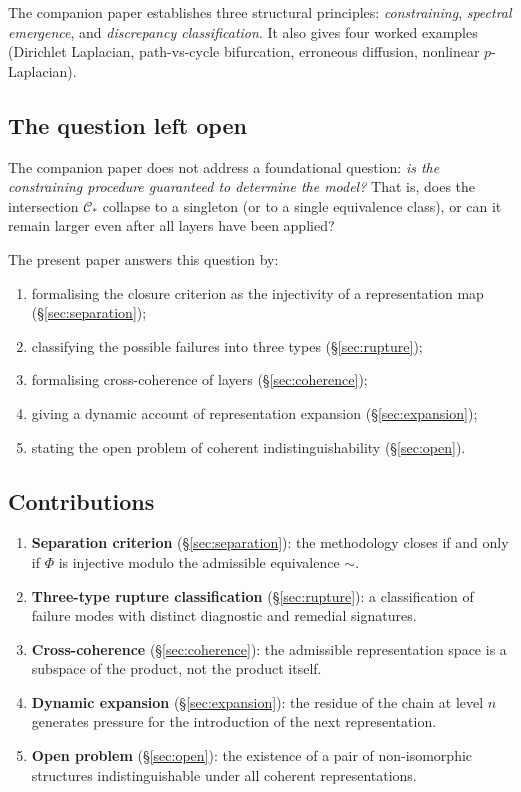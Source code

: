 \documentclass[11pt,a4paper]{article}
\theoremstyle{definition}
\theoremstyle{plain}
\newcommand{\Ccal}{\mathcal{C}}
\newcommand{\Phimap}{\Phi}
\newcommand{\simadm}{\sim}
\begin{document}
The companion paper establishes three structural principles:
\emph{constraining}, \emph{spectral emergence}, and
\emph{discrepancy classification}. It also gives four worked
examples (Dirichlet Laplacian, path-vs-cycle bifurcation, erroneous
diffusion, nonlinear $p$-Laplacian).

\subsection{The question left open}

The companion paper does not address a foundational question: 
\emph{is the constraining procedure guaranteed to determine the
model?} That is, does the intersection $\Ccal_\ast$ collapse to a
singleton (or to a single equivalence class), or can it remain
larger even after all layers have been applied?

The present paper answers this question by:
\begin{enumerate}[label=(\roman*)]
  \item formalising the closure criterion as the injectivity of a
        representation map (\S\ref{sec:separation});
  \item classifying the possible failures into three types
        (\S\ref{sec:rupture});
  \item formalising cross-coherence of layers
        (\S\ref{sec:coherence});
  \item giving a dynamic account of representation expansion
        (\S\ref{sec:expansion});
  \item stating the open problem of coherent indistinguishability
        (\S\ref{sec:open}).
\end{enumerate}

\subsection{Contributions}

\begin{enumerate}[label=(\roman*)]
  \item \textbf{Separation criterion} (\S\ref{sec:separation}): the
        methodology closes if and only if $\Phimap$ is injective
        modulo the admissible equivalence $\simadm$.
  \item \textbf{Three-type rupture classification}
        (\S\ref{sec:rupture}): a classification of failure modes
        with distinct diagnostic and remedial signatures.
  \item \textbf{Cross-coherence} (\S\ref{sec:coherence}): the
        admissible representation space is a subspace of the
        product, not the product itself.
  \item \textbf{Dynamic expansion} (\S\ref{sec:expansion}): the
        residue of the chain at level $n$ generates pressure for
        the introduction of the next representation.
  \item \textbf{Open problem} (\S\ref{sec:open}): the existence of
        a pair of non-isomorphic structures indistinguishable under
        all coherent representations.
\end{enumerate}
\end{document}
